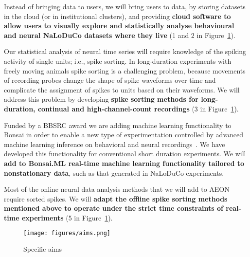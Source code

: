 Instead of bringing data to users, we will bring users to data, by storing
datasets in the cloud (or in institutional clusters), and providing
\textbf{cloud software to allow users to visually explore and statistically
analyse behavioural and neural NaLoDuCo datasets where they live}
(1 and 2 in Figure~\ref{fig:aims}).

Our statistical analysis of neural time series will require knowledge of the
spiking activity of single units; i.e., spike sorting. In long-duration
experiments with freely moving animals spike sorting is a challenging problem,
because movements of recording probes change the shape of spike waveforms over
time and complicate the assignment of spikes to units based on their waveforms.
We will address this problem by developing \textbf{spike sorting methods for
long-duration, continual and high-channel-count recordings} (3 in
Figure~\ref{fig:aims}).

Funded by a BBSRC award we are adding machine learning functionality to Bonsai
in order to enable a new type of experimentation controlled by advanced machine
learning inference on behavioral and neural
recordings~\citep[Bonsai.ML,][]{bonsaiML25}. We have developed this
functionality for conventional short duration experiments. We will
\textbf{add to Bonsai.ML real-time machine learning functionality tailored to
nonstationary data}, such as that generated in NaLoDuCo experiments.

Most of the online neural data analysis methods that we will add to AEON
require sorted spikes. We will \textbf{adapt the offline spike sorting methods
mentioned above to operate under the strict time constraints of real-time
experiments} (5 in Figure~\ref{fig:aims}).

\begin{figure}
    \begin{center}
        \texttt{[image: figures/aims.png]}
    \end{center}
    \caption{Specific aims}
    \label{fig:aims}
\end{figure}

